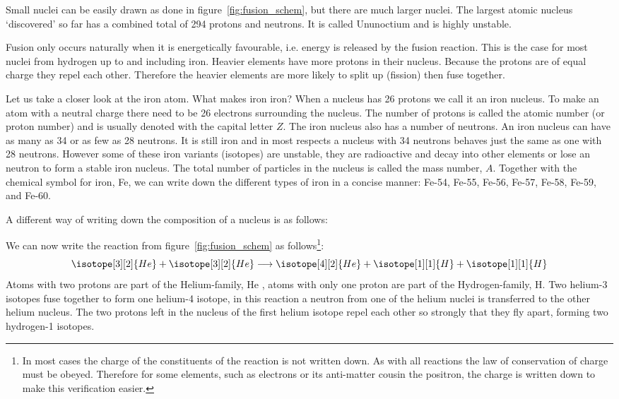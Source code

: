 \documentclass[12pt,a4paper]{article}
\numberwithin{equation}{section}
\numberwithin{figure}{section}
\numberwithin{table}{section}
\begin{document}
Small nuclei can be easily drawn as done in figure~\ref{fig:fusion_schem}, but there are much larger nuclei. The largest atomic nucleus `discovered' so far has a combined total of 294 protons and neutrons. It is called Ununoctium and is highly unstable.

Fusion only occurs naturally when it is energetically favourable, i.e. energy is released by the fusion reaction. This is the case for most nuclei from hydrogen up to and including iron. Heavier elements have more protons in their nucleus. Because the protons are of equal charge they repel each other. Therefore the heavier elements are more likely to split up (fission) then fuse together.

Let us take a closer look at the iron atom. What makes iron iron? When a nucleus has 26 protons we call it an iron nucleus. To make an atom with a neutral charge there need to be 26 electrons surrounding the nucleus. The number of protons is called the atomic number (or proton number) and is usually denoted with the capital letter $Z$. The iron nucleus also has a number of neutrons. An iron nucleus can have as many as 34 or as few as 28 neutrons. It is still iron and in most respects a nucleus with 34 neutrons behaves just the same as one with 28 neutrons. However some of these iron variants (isotopes) are unstable, they are radioactive and decay into other elements or lose an neutron to form a stable iron nucleus.
The total number of particles in the nucleus is called the mass number, $A$. Together with the chemical symbol for iron, Fe, we can write down the different types of iron in a concise manner: Fe-54, Fe-55, Fe-56, Fe-57, Fe-58, Fe-59, and Fe-60.

A different way of writing down the composition of a nucleus is as follows:
\begin{center}  \end{center}
We can now write the reaction from figure~\ref{fig:fusion_schem} as follows\footnote{In most cases the charge of the constituents of the reaction is not written down. As with all reactions the law of conservation of charge must be obeyed. Therefore for some elements, such as electrons or its anti-matter cousin the positron, the charge is written down to make this verification easier.}:
\begin{equation*}
\isotope[3][2]{He} + \isotope[3][2]{He} \longrightarrow \isotope[4][2]{He} + \isotope[1][1]{H} + \isotope[1][1]{H}
\end{equation*}
Atoms with two protons are part of the Helium-family, He , atoms with only one proton are part of the Hydrogen-family, H. Two helium-3 isotopes fuse together to form one helium-4 isotope, in this reaction a neutron from one of the helium nuclei is transferred to the other helium nucleus. The two protons left in the nucleus of the first helium isotope repel each other so strongly that they fly apart, forming two hydrogen-1 isotopes.
\end{document}
